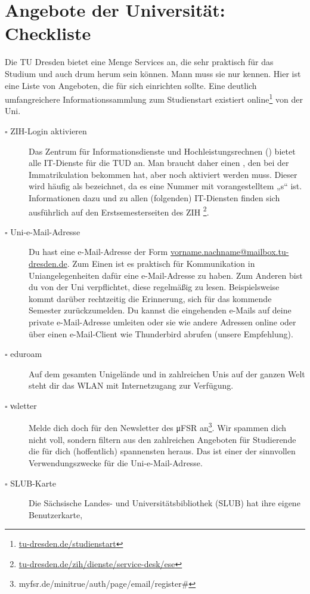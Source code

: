 \documentclass{scrartcl}
\begin{document}
\section{Angebote der Universität: Checkliste}
\label{sec:angebote_der_universitat}
Die TU Dresden bietet eine Menge Services an, die sehr praktisch für das Studium und auch drum herum sein können.
Mann muss sie nur kennen. Hier ist eine Liste von Angeboten, die für sich einrichten sollte.
Eine deutlich umfangreichere Informationssammlung zum Studienstart
existiert online\footnote{\url{tu-dresden.de/studienstart}} von der Uni.
\newcommand{\clitem}[1]{\item[$\square$ #1]}
\begin{description}
  \clitem{ZIH-Login aktivieren} Das Zentrum für Informationsdienste und Hochleistungsrechnen ()
    bietet alle IT-Dienste für die TUD an. Man braucht daher einen , den bei der
    Immatrikulation bekommen hat, aber noch aktiviert werden muss.
    Dieser wird häufig als  bezeichnet, da es eine Nummer mit vorangestelltem „s“ ist.
    Informationen dazu und zu allen (folgenden) IT-Diensten finden sich ausführlich auf den Erstsemesterseiten des ZIH \footnote{\url{tu-dresden.de/zih/dienste/service-desk/ese}\label{zihurl}}.
    \clitem{Uni-e-Mail-Adresse} Du hast eine e-Mail-Adresse der Form \url{vorname.nachname@mailbox.tu-dresden.de}.
    Zum Einen ist es praktisch für Kommunikation in Uniangelegenheiten dafür eine e-Mail-Adresse zu haben.
    Zum Anderen bist du von der Uni verpflichtet, diese regelmäßig zu lesen.
    Beispielsweise kommt darüber rechtzeitig die Erinnerung, sich für das kommende Semester zurückzumelden.
    Du kannst die eingehenden e-Mails auf deine private e-Mail-Adresse umleiten oder sie wie andere Adressen
    online oder über einen e-Mail-Client wie Thunderbird abrufen (unsere Empfehlung).
  \clitem{eduroam} Auf dem gesamten Unigelände und in zahlreichen Unis auf der ganzen Welt steht dir
    das WLAN  mit Internetzugang zur Verfügung.
    \clitem{νsletter} Melde dich doch für den Newsletter des μFSR an\footnote{myfsr.de/minitrue/auth/page/email/register\#}.
    Wir spammen dich nicht voll, sondern
    filtern aus den zahlreichen Angeboten für Studierende die für dich (hoffentlich) spannensten heraus.
    Das ist einer der sinnvollen Verwendungszwecke für die Uni-e-Mail-Adresse.
  \clitem{SLUB-Karte} Die Sächsische Landes- und Universitätsbibliothek (SLUB) hat ihre eigene Benutzerkarte,

\end{description}
\end{document}
